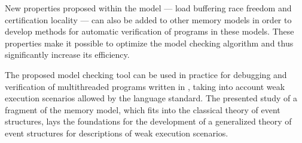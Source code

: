 
New properties proposed within the \WkmS model ---
load buffering race freedom and certification locality ---
can also be added to other memory models in order to develop methods for automatic verification of programs in these models.
These properties make it possible to optimize the model checking algorithm and thus significantly increase its efficiency.

The proposed model checking tool can be used in practice for debugging and verification of multithreaded programs written in \CLANG, taking into account weak execution scenarios allowed by the language standard.
The presented study of a fragment of the \Wkm memory model, 
which fits into the classical theory of event structures, 
lays the foundations for the development of a generalized theory of event structures for
descriptions of weak execution scenarios.


